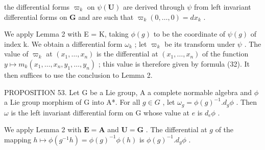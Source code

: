 the differential forms \(\varpi_k\) on \(\psi(\mathbf{U})\) are derived through \(\psi\) from left invariant differential forms on \(\mathbf{G}\) and are such that \(\varpi_k(0,\ldots,0) = dx_k\) .

We apply Lemma 2 with E = K, taking \(\phi(g)\) to be the coordinate of \(\psi(g)\) of index k. We obtain a differential form \(\omega_{k}\) ; let \(\varpi_{k}\) be its transform under \(\psi\) . The value of \(\varpi_{k}\) at \((x_{1},\ldots,x_{n})\) is the differential at \((x_{1},\ldots,x_{n})\) of the function \(y\mapsto m_{k}(x_{1},\ldots,x_{n},y_{1},\ldots,y_{n})\) ; this value is therefore given by formula (32). It then suffices to use the conclusion to Lemma 2.

PROPOSITION 53. Let G be a Lie group, A a complete normable algebra and \(\phi\) a Lie group morphism of G into A*. For all \(g \in G\) , let \(\omega_g = \phi(g)^{-1}.d_g\phi\) . Then \(\omega\) is the left invariant differential form on G whose value at \(e\) is \(d_e\phi\) .

We apply Lemma 2 with \(\mathbf{E} = \mathbf{A}\) and \(\mathbf{U} = \mathbf{G}\) . The differential at \(g\) of the mapping \(h \mapsto \phi(g^{-1}h) = \phi(g)^{-1}\phi(h)\) is \(\phi(g)^{-1}.d_g\phi\) .


